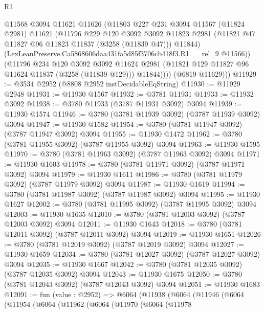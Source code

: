 \begin{lexlean}{R1}
\begin{coremodule}
              @11568
              @3094
              @11621
              @11626
              (@11803
                @227
                @231
                @3094
                @11567
                (@11824 @2981)
                @11621
                (@11796
                  @229
                  @120
                  @3092
                  @3092
                  @11823
                  @2981
                  (@11821 @47 @11827 @96 @11823 @11837 (@3258 (@11839 @47)))
                  @11844)
                (LexLeanPreserve.Ca5868606daa431fa5d85f3706cb418f3.R1.__rel_9 @11566))
              (@11796
                @234
                @120
                @3092
                @3092
                @11624
                @2981
                (@11821 @129 @11827 @96 @11624 @11837 (@3258 (@11839 @129)))
                @11844))))
        (@6819 @11629)))
@11929 := @3534 @2952 (@8808 @2952 instDecidableEqString)
@11930 := @11929 @2948
@11931 := @11930 @1567
@11932 := @3781 @11931
@11933 := @11932 @3092
@11938 := @3780 @11933 (@3787 @11931 @3092) @3094
@11939 := @11930 @1574
@11946 := @3780 (@3781 @11939 @3092) (@3787 @11939 @3092) @3094
@11947 := @11930 @1582
@11954 := @3780 (@3781 @11947 @3092) (@3787 @11947 @3092) @3094
@11955 := @11930 @1472
@11962 := @3780 (@3781 @11955 @3092) (@3787 @11955 @3092) @3094
@11963 := @11930 @1595
@11970 := @3780 (@3781 @11963 @3092) (@3787 @11963 @3092) @3094
@11971 := @11930 @1603
@11978 := @3780 (@3781 @11971 @3092) (@3787 @11971 @3092) @3094
@11979 := @11930 @1611
@11986 := @3780 (@3781 @11979 @3092) (@3787 @11979 @3092) @3094
@11987 := @11930 @1619
@11994 := @3780 (@3781 @11987 @3092) (@3787 @11987 @3092) @3094
@11995 := @11930 @1627
@12002 := @3780 (@3781 @11995 @3092) (@3787 @11995 @3092) @3094
@12003 := @11930 @1635
@12010 := @3780 (@3781 @12003 @3092) (@3787 @12003 @3092) @3094
@12011 := @11930 @1643
@12018 := @3780 (@3781 @12011 @3092) (@3787 @12011 @3092) @3094
@12019 := @11930 @1651
@12026 := @3780 (@3781 @12019 @3092) (@3787 @12019 @3092) @3094
@12027 := @11930 @1659
@12034 := @3780 (@3781 @12027 @3092) (@3787 @12027 @3092) @3094
@12035 := @11930 @1667
@12042 := @3780 (@3781 @12035 @3092) (@3787 @12035 @3092) @3094
@12043 := @11930 @1675
@12050 := @3780 (@3781 @12043 @3092) (@3787 @12043 @3092) @3094
@12051 := @11930 @1683
@12091 := fun (value : @2952) =>
  @6064
    (@11938
      (@6064
        (@11946
          (@6064
            (@11954
              (@6064
                (@11962
                  (@6064
                    (@11970
                      (@6064
                        (@11978

\end{coremodule}
\end{lexlean}
